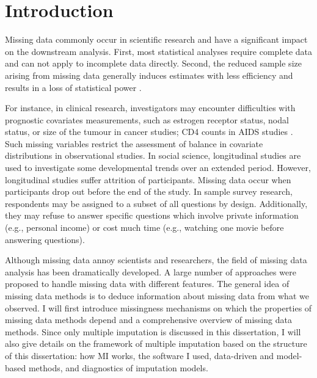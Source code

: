\chapter{Introduction} 
\label{chap1}
	Missing data commonly occur in scientific research and have a significant impact on the downstream analysis. First, most statistical analyses require complete data and can not apply to incomplete data directly. Second, the reduced sample size arising from missing data generally induces estimates with less efficiency and results in a loss of statistical power \citep{RubinD1987}.

For instance, in clinical research, investigators may encounter difficulties with prognostic covariates measurements, such as estrogen receptor status, nodal status, or size of the tumour in cancer studies; CD4 counts in AIDS studies \citep{ibrahim2012missing}. Such missing variables restrict the assessment of balance in covariate distributions in observational studies. In social science, longitudinal studies are used to investigate some developmental trends over an extended period. However, longitudinal studies suffer attrition of participants. Missing data occur when participants drop out before the end of the study. In sample survey research, respondents may be assigned to a subset of all questions by design. Additionally, they may refuse to answer specific questions which involve private information (e.g., personal income) or cost much time (e.g., watching one movie before answering questions).  

Although missing data annoy scientists and researchers, the field of missing data analysis has been dramatically developed. A large number of approaches were proposed to handle missing data with different features. The general idea of missing data methods is to deduce information about missing data from what we observed. I will first introduce missingness mechanisms on which the properties of missing data methods depend and a comprehensive overview of missing data methods. Since only multiple imputation is discussed in this dissertation, I will also give details on the framework of multiple imputation based on the structure of this dissertation: how MI works, the software I used, data-driven and model-based methods, and diagnostics of imputation models.   

